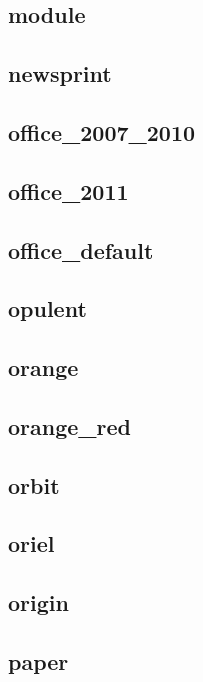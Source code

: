 \subsection{\ttfamily module}
\newpage
\subsection{\ttfamily newsprint}
\newpage
\subsection{\ttfamily office\_2007\_2010}
\newpage
\subsection{\ttfamily office\_2011}
\newpage
\subsection{\ttfamily office\_default}
\newpage
\subsection{\ttfamily opulent}
\newpage
\subsection{\ttfamily orange}
\newpage
\subsection{\ttfamily orange\_red}
\newpage
\subsection{\ttfamily orbit}
\newpage
\subsection{\ttfamily oriel}
\newpage
\subsection{\ttfamily origin}
\newpage
\subsection{\ttfamily paper}
\newpage
